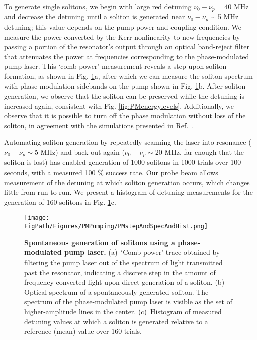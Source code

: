 To generate single solitons, we begin with large red detuning $\nu_0-\nu_{p}=40$ MHz and decrease the detuning until a soliton is generated near $\nu_0-\nu_{p}\sim$5 MHz detuning; this value depends on the pump power and coupling condition. We measure the power converted by the Kerr nonlinearity to new frequencies by passing a portion of the resonator's output through an optical band-reject filter that attenuates the power at frequencies corresponding to the phase-modulated pump laser. This `comb power' measurement reveals a step upon soliton formation, as shown in Fig. \ref{fig:PMgen}a, after which we can measure the soliton spectrum with phase-modulation sidebands on the pump shown in Fig. \ref{fig:PMgen}b. After soliton generation, we observe that the soliton can be preserved while the detuning is increased again, consistent with Fig. \ref{fig:PMenergylevels}. Additionally, we observe that it is possible to turn off the phase modulation without loss of the soliton, in agreement with the simulations presented in Ref.~.

Automating soliton generation by repeatedly scanning the laser into resonance ($\nu_0-\nu_{p}\sim$5 MHz) and back out again ($\nu_0-\nu_{p}\sim$20 MHz, far enough that the soliton is lost) has enabled generation of 1000 solitons in 1000 trials over 100 seconds, with a measured 100 $\%$ success rate. Our probe beam allows measurement of the detuning at which soliton generation occurs, which changes little from run to run. We present a histogram of detuning measurements for the generation of 160 solitons in Fig. \ref{fig:PMgen}c. 

\begin{figure}[htpb]
	\begin{center}
		\texttt{[image: \\FigPath/Figures/PMPumping/PMstepAndSpecAndHist.png]}
	\end{center}
	\caption[Spontaneous generation of solitons using a phase-modulated pump laser]{\textbf{Spontaneous generation of solitons using a phase-modulated pump laser.} (a)~`Comb power' trace obtained by filtering the pump laser out of the spectrum of light transmitted past the resonator, indicating a discrete step in the amount of frequency-converted light upon direct generation of a soliton. (b) Optical spectrum of a spontaneously generated soliton. The spectrum of the phase-modulated pump laser is visible as the set of higher-amplitude lines in the center. (c)~Histogram of measured detuning values at which a soliton is generated relative to a reference (mean) value over 160 trials.}
	\label{fig:PMgen}
\end{figure} 

